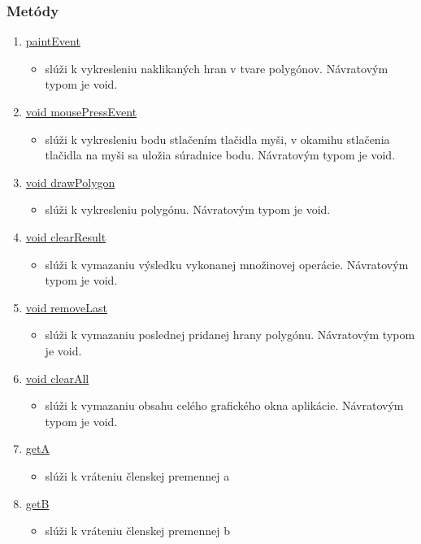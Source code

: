 \documentclass[12pt]{article}
\begin{document}
\subsubsection{Metódy}
\begin{enumerate}
\item[] \underline{paintEvent}
\begin{itemize}
\item slúži k vykresleniu naklikaných hran v tvare polygónov. Návratovým typom je void.
\end{itemize}
\item[] \underline{void mousePressEvent}
\begin{itemize}
\item slúži k vykresleniu bodu  stlačením tlačidla myši, v okamihu stlačenia tlačidla na myši sa uložia súradnice bodu. Návratovým typom je void.
\end{itemize}
\item[] \underline{void drawPolygon}
\begin{itemize}
\item slúži k vykresleniu polygónu. Návratovým typom je void.
\end{itemize}
\item[] \underline{void clearResult}
\begin{itemize}
\item slúži k vymazaniu výsledku vykonanej množinovej operácie. Návratovým typom je void.
\end{itemize}
\item[] \underline{void removeLast}
\begin{itemize}
\item slúži k vymazaniu poslednej pridanej hrany polygónu. Návratovým typom je void.
\end{itemize}
\item[] \underline{void clearAll}
\begin{itemize}
\item slúži k vymazaniu obsahu celého grafického okna aplikácie. Návratovým typom je void.
\end{itemize}

\item[] \underline{getA}
\begin{itemize}
\item slúži k vráteniu členskej premennej a
\end{itemize}

\item[] \underline{getB}
\begin{itemize}
\item slúži k vráteniu členskej premennej b
\end{itemize}


\end{enumerate}
\end{document}
